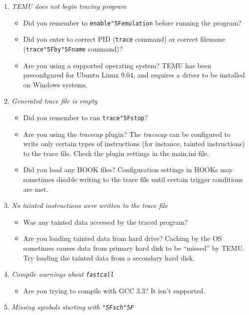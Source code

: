 \documentclass[11pt,onecolumn]{article}
\def\_{\char"5F}
\begin{document}
\begin {enumerate}
  \item \emph {TEMU does not begin tracing program}
    \begin{itemize}
    \item {Did you remember to \texttt{enable\_emulation} before running the program?} 
    \item {Did you enter to correct PID (\texttt{trace} command) or correct filename 
    (\texttt{trace\_by\_name} command)?}     
    \item {Are you using a supported operating system? TEMU has been preconfigured for
    Ubuntu Linux 9.04, and requires a driver to be installed on Windows systems.}     
    \end{itemize}
  \item \emph {Generated trace file is empty}
    \begin{itemize}
    \item {Did you remember to run \texttt{trace\_stop}?}     
    \item {Are you using the \emph{tracecap} plugin? The \emph{tracecap} can be configured 
    to write only certain types of instructions (for instance, tainted instructions) to the trace file. 
    Check the plugin settings in the main.ini file.}       
    \item {Did you load any HOOK files? Configuration settings in HOOKs may sometimes 
    disable writing to the trace file until certain trigger conditions are met.} 
    \end{itemize}  
  \item \emph {No tainted instructions were written to the trace file}
    \begin{itemize}
    \item {Was any tainted data accessed by the traced program?}
    \item {Are you loading tainted data from hard drive? Caching by the OS sometimes 
      causes data from primary hard disk to be ``missed'' by TEMU. Try loading the tainted data 
      from a secondary hard disk.} 
    \end{itemize}   
  \item \emph {Compile warnings about {\tt fastcall}}
    \begin{itemize}
    \item {Are you trying to compile with GCC 3.3? It isn't supported.}
    \end{itemize}
  \item \emph {Missing symbols starting with {\tt \_sch\_}}

\end{enumerate}
\end{document}
